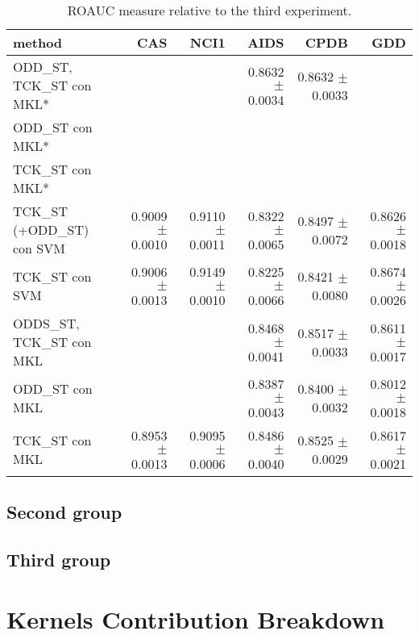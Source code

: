 \begin{landscape}
    \begin{table}[ht]
        \centering
        \begin{tabular}{|l|r|r|r|r|r|}
            \hline
            method&CAS&NCI1&AIDS&CPDB&GDD\\
            \hline
            ODD\_ST, TCK\_ST con MKL*&&&0.8632 $\pm$ 0.0034&0.8632 $\pm$ 0.0033&\\
            \hline
            ODD\_ST con MKL*&&&&&\\
            \hline
            TCK\_ST con MKL*&&&&&\\
            \hline
            TCK\_ST (+ODD\_ST) con SVM&0.9009 $\pm$ 0.0010&0.9110 $\pm$ 0.0011&0.8322 $\pm$ 0.0065&0.8497 $\pm$ 0.0072&0.8626 $\pm$ 0.0018\\
            \hline
            TCK\_ST con SVM&0.9006 $\pm$ 0.0013&0.9149 $\pm$ 0.0010&0.8225 $\pm$ 0.0066&0.8421 $\pm$ 0.0080&0.8674 $\pm$ 0.0026\\
            \hline
            ODDS\_ST, TCK\_ST con MKL&&&0.8468 $\pm$ 0.0041&0.8517 $\pm$ 0.0033&0.8611 $\pm$ 0.0017\\
            \hline
            ODD\_ST con MKL&&&0.8387 $\pm$ 0.0043&0.8400 $\pm$ 0.0032&0.8012$\pm$ 0.0018\\
            \hline
            TCK\_ST con MKL&0.8953 $\pm$ 0.0013&0.9095 $\pm$ 0.0006&0.8486 $\pm$ 0.0040&0.8525 $\pm$ 0.0029&0.8617 $\pm$ 0.0021\\
            \hline
        \end{tabular}
        \label{table:results_wl}
        \caption{ROAUC measure relative to the third experiment. }
    \end{table}
\end{landscape}

\subsection{Second group}
\subsection{Third group}

\section{Kernels Contribution Breakdown}

